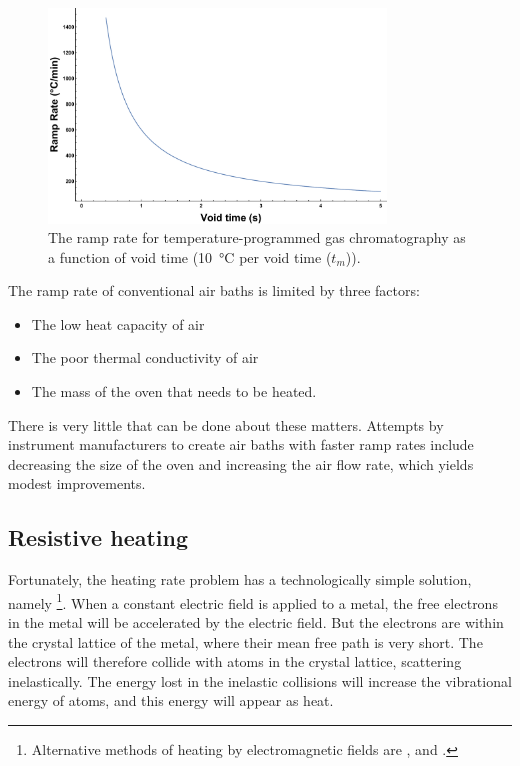 \begin{figure}
	\centering
	\includegraphics[width=0.8\textwidth]{Figures/RampRate.pdf}
	\decoRule
	\caption[Suggested ramp rate]{The ramp rate for temperature-programmed gas chromatography as a function of void time (\SI{10}{\celsius} per
void time (\(t_m\))).}
	\label{fig:RampRateBlumberg}
\end{figure}

The ramp rate of conventional air baths is limited by three factors:

\begin{itemize}
	\item The low heat capacity of air
	\item The poor thermal conductivity of air
	\item The mass of the oven that needs to be heated. 
\end{itemize}

There is very little that can be done about these matters. Attempts by
instrument manufacturers to create air baths with faster ramp rates include
decreasing the size of the oven and increasing the air flow rate, which yields
modest improvements.

\subsection{Resistive heating}

Fortunately, the heating rate problem has a technologically simple solution,
namely \footnote{Alternative methods of heating by
electromagnetic fields are ,  and .}. When a constant electric field is
applied to a metal, the free electrons in the metal will be accelerated by the
electric field. But the electrons are within the crystal lattice of the metal,
where their mean free path is very short. The electrons will therefore collide
with atoms in the crystal lattice, scattering inelastically. The energy lost in
the inelastic collisions will increase the vibrational energy of atoms, and
this energy will appear as heat.

